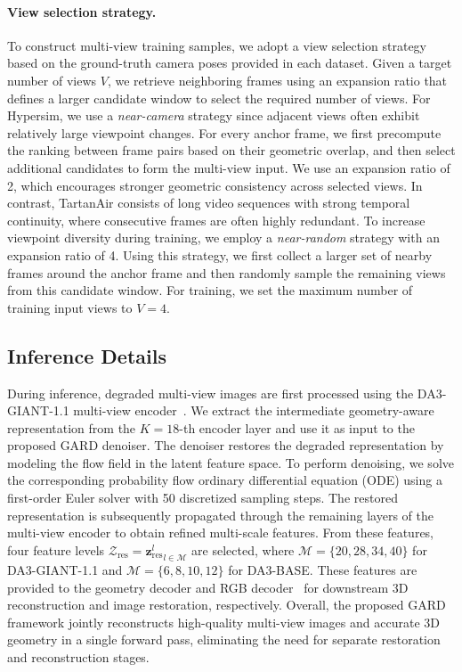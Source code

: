\documentclass{llmxive}
\begin{document}
\paragraph{View selection strategy.}
To construct multi-view training samples, we adopt a view selection strategy based on the ground-truth camera poses provided in each dataset. Given a target number of views $V$, we retrieve neighboring frames using an expansion ratio that defines a larger candidate window to select the required number of views. For Hypersim, we use a \textit{near-camera} strategy since adjacent views often exhibit relatively large viewpoint changes. For every anchor frame, we first precompute the ranking between frame pairs based on their geometric overlap, and then select additional candidates to form the multi-view input. We use an expansion ratio of 2, which encourages stronger geometric consistency across selected views. In contrast, TartanAir consists of long video sequences with strong temporal continuity, where consecutive frames are often highly redundant. To increase viewpoint diversity during training, we employ a \textit{near-random} strategy with an expansion ratio of 4. Using this strategy, we first collect a larger set of nearby frames around the anchor frame and then randomly sample the remaining views from this candidate window. For training, we set the maximum number of training input views to $V=4$.

\subsection{Inference Details}
During inference, degraded multi-view images are first processed using the DA3-GIANT-1.1 multi-view encoder~\cite{depthanything3}. We extract the intermediate geometry-aware representation from the $K=18$-th encoder layer and use it as input to the proposed GARD denoiser. The denoiser restores the degraded representation by modeling the flow field in the latent feature space. To perform denoising, we solve the corresponding probability flow ordinary differential equation (ODE) using a first-order Euler solver with 50 discretized sampling steps. The restored representation is subsequently propagated through the remaining layers of the multi-view encoder to obtain refined multi-scale features. From these features, four feature levels $\mathcal{Z}_{\text{res}} = {\mathbf{z}_{\text{res}}^{l}}_{l \in \mathcal{M}}$ are selected, where $\mathcal{M}=\{20, 28, 34, 40\}$ for DA3-GIANT-1.1 and $\mathcal{M}=\{6, 8, 10, 12\}$ for DA3-BASE. These features are provided to the geometry decoder and RGB decoder~\cite{jang2026gld} for downstream 3D reconstruction and image restoration, respectively. Overall, the proposed GARD framework jointly reconstructs high-quality multi-view images and accurate 3D geometry in a single forward pass, eliminating the need for separate restoration and reconstruction stages.
\end{document}
